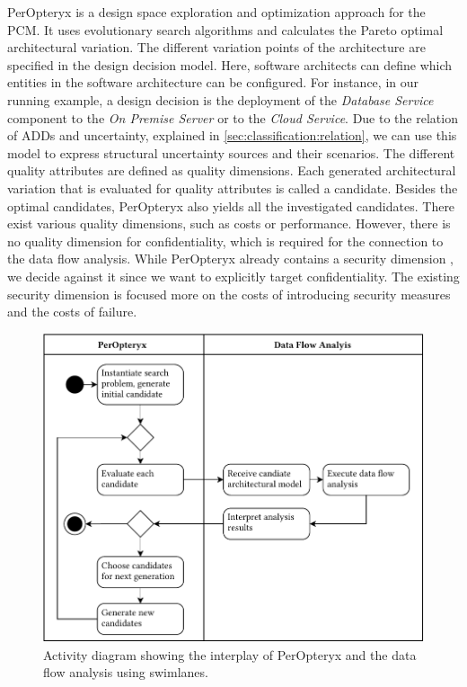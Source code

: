 PerOpteryx \cite{koziolek_peropteryx_2011,koziolek_automated_2011} is a design space exploration and optimization approach for the \ac{PCM}. 
It uses evolutionary search algorithms and calculates the Pareto optimal architectural variation. 
The different variation points of the architecture are specified in the design decision model. 
Here, software architects can define which entities in the software architecture can be configured. 
For instance, in our running example, a design decision is the deployment of the \emph{Database Service} component to the \emph{On Premise Server} or to the \emph{Cloud Service}.
Due to the relation of \acp{ADD} and uncertainty, explained in \autoref{sec:classification:relation}, we can use this model to express structural uncertainty sources and their scenarios.
The different quality attributes are defined as quality dimensions.
Each generated architectural variation that is evaluated for quality attributes is called a candidate. 
Besides the optimal candidates, PerOpteryx also yields all the investigated candidates.
There exist various quality dimensions, such as costs or performance. 
However, there is no quality dimension for confidentiality, which is required for the connection to the data flow analysis. 
While PerOpteryx already contains a security dimension \cite{busch_modelling_2016}, we decide against it since we want to explicitly target confidentiality. 
The existing security dimension is focused more on the costs of introducing security measures and the costs of failure.

\begin{figure}
    \centering
    \includegraphics[width=\textwidth]{figures/chapter7/peropteryx.pdf}
    \caption{Activity diagram showing the interplay of PerOpteryx and the data flow analysis using swimlanes.}
    \label{fig:confidentialityanalysis:peropteryx}
\end{figure}

